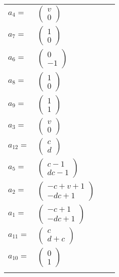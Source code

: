\documentclass[1p]{elsarticle_modified}
\theoremstyle{definition}
\begin{document}
\begin{tabular}{m{7pt} m{180pt} m{7pt} m{180pt} }
\flushright $a_{4}=$&$\begin{pmatrix}v\\0\end{pmatrix}$ \\
\flushright $a_{7}=$&$\begin{pmatrix}1\\0\end{pmatrix}$ \\
\flushright $a_{6}=$&$\begin{pmatrix}0\\-1\end{pmatrix}$ \\
\flushright $a_{8}=$&$\begin{pmatrix}1\\0\end{pmatrix}$ \\
\flushright $a_{9}=$&$\begin{pmatrix}1\\1\end{pmatrix}$ \\
\flushright $a_{3}=$&$\begin{pmatrix}v\\0\end{pmatrix}$ \\
\flushright $a_{12}=$&$\begin{pmatrix}c\\d\end{pmatrix}$ \\
\flushright $a_{5}=$&$\begin{pmatrix}c-1\\d c-1\end{pmatrix}$ \\
\flushright $a_{2}=$&$\begin{pmatrix}- c+v+1\\- d c+1\end{pmatrix}$ \\
\flushright $a_{1}=$&$\begin{pmatrix}- c+1\\- d c+1\end{pmatrix}$ \\
\flushright $a_{11}=$&$\begin{pmatrix}c\\d+c\end{pmatrix}$ \\
\flushright $a_{10}=$&$\begin{pmatrix}0\\1\end{pmatrix}$\\&\end{tabular}
\end{document}
